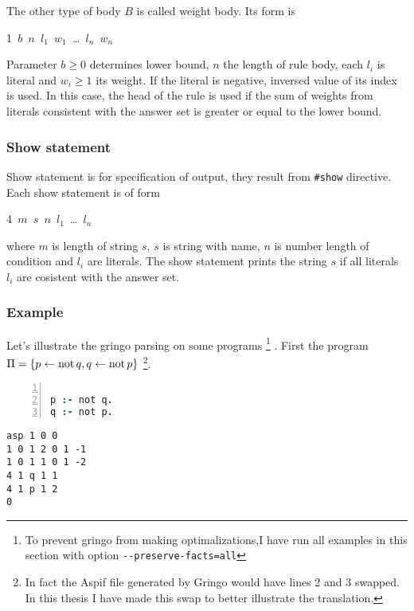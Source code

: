\documentclass[
    digital,
    color,
    oneside,
    sansbold,
    lot,
    nolof
]{fithesis}
\begin{document}
The other type of body $B$ is called weight body. Its form is
{%
\newcommand{\ms}{\texttt{ }}
\begin{center}
    1\ms{}$b$\ms{}$n$\ms{}$l_1$\ms{}$w_1$\ms{}\dots\ms$l_n$\ms$w_n$
\end{center}
}\noindent
Parameter $b\geq 0$ determines lower bound, $n$
the length of rule body, each $l_i$ is literal and $w_i\geq 1$ its weight.
If the literal is negative, inversed value of its index is used.
In this case, the head of the rule is used if the sum of weights from literals
consistent with the answer set is greater or equal to the lower bound.

\subsubsection{Show statement}

Show statement is for specification of output, they result from \texttt{\#show}
directive. Each show statement is of form
{%
\newcommand{\ms}{\texttt{ }}
\begin{center}
    4\ms{}$m$\ms{}$s$\ms{}$n$\ms{}$l_1$\ms{}\dots\ms$l_n$
\end{center}
}\noindent
where $m$ is length of string $s$, $s$ is string
with name, $n$ is number length of condition and $l_i$ are literals.
The show statement prints the string $s$ if all literals $l_i$ are cosistent
with the answer set.

\subsubsection{Example}

Let's illustrate the gringo parsing on some programs%
\footnote{To prevent gringo from making optimalizations,I have run all examples
in this section with option \texttt{{-}{-}preserve-facts=all}}%
. First the program 
$\Pi = \{p \leftarrow{} \mathrm{not}\, q, q \leftarrow{} \mathrm{not}\, p\}$%
\footnote{In fact the Aspif file generated by Gringo would have lines 2 and 3
swapped. In this thesis I have made this swap to better illustrate
the translation.}.

\begin{minipage}[t]{0.45\linewidth}
\centering
\begin{lstlisting}[language=prolog, numbers=left, countblanklines=false]

p :- not q.
q :- not p.
\end{lstlisting}
\end{minipage}
\hspace{1em}
\begin{minipage}[t]{0.45\linewidth}
\centering
\begin{lstlisting}[numbers=right, countblanklines=false]
asp 1 0 0
1 0 1 2 0 1 -1
1 0 1 1 0 1 -2
4 1 q 1 1
4 1 p 1 2
0
\end{lstlisting}
\end{minipage}
\end{document}
